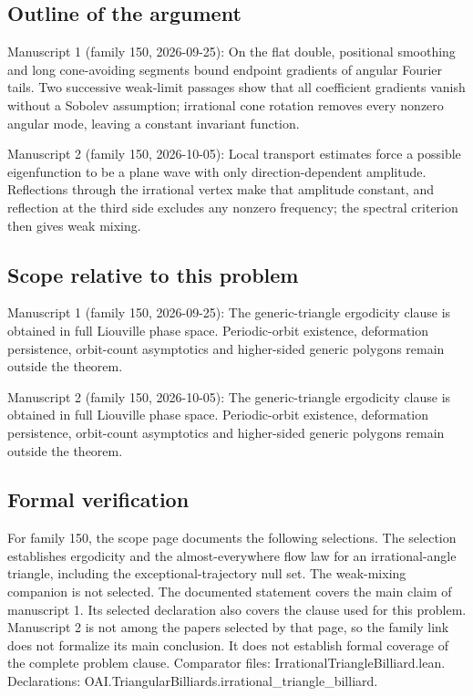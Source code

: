 \documentclass[11pt]{article}
\begin{document}
\subsection{Outline of the argument}
Manuscript 1 (family 150, 2026-09-25): On the flat double, positional smoothing and long cone-avoiding segments bound endpoint gradients of angular Fourier tails. Two successive weak-limit passages show that all coefficient gradients vanish without a Sobolev assumption; irrational cone rotation removes every nonzero angular mode, leaving a constant invariant function.

Manuscript 2 (family 150, 2026-10-05): Local transport estimates force a possible eigenfunction to be a plane wave with only direction-dependent amplitude. Reflections through the irrational vertex make that amplitude constant, and reflection at the third side excludes any nonzero frequency; the spectral criterion then gives weak mixing.

\subsection{Scope relative to this problem}
Manuscript 1 (family 150, 2026-09-25): The generic-triangle ergodicity clause is obtained in full Liouville phase space. Periodic-orbit existence, deformation persistence, orbit-count asymptotics and higher-sided generic polygons remain outside the theorem.

Manuscript 2 (family 150, 2026-10-05): The generic-triangle ergodicity clause is obtained in full Liouville phase space. Periodic-orbit existence, deformation persistence, orbit-count asymptotics and higher-sided generic polygons remain outside the theorem.

\subsection{Formal verification}
For family 150, the scope page documents the following selections. The selection establishes ergodicity and the almost-everywhere flow law for an irrational-angle triangle, including the exceptional-trajectory null set. The weak-mixing companion is not selected. The documented statement covers the main claim of manuscript 1. Its selected declaration also covers the clause used for this problem. Manuscript 2 is not among the papers selected by that page, so the family link does not formalize its main conclusion. It does not establish formal coverage of the complete problem clause. Comparator files: IrrationalTriangleBilliard.lean. Declarations: OAI.TriangularBilliards.irrational\_triangle\_billiard.
\end{document}
